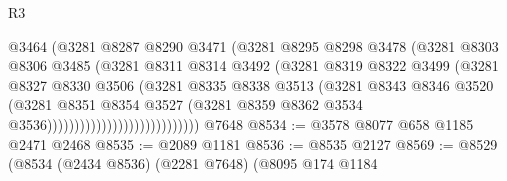 \begin{lexlean}{R3}
\begin{coremodule}
                                        @3464
                                        (@3281
                                          @8287
                                          @8290
                                          @3471
                                          (@3281
                                            @8295
                                            @8298
                                            @3478
                                            (@3281
                                              @8303
                                              @8306
                                              @3485
                                              (@3281
                                                @8311
                                                @8314
                                                @3492
                                                (@3281
                                                  @8319
                                                  @8322
                                                  @3499
                                                  (@3281
                                                    @8327
                                                    @8330
                                                    @3506
                                                    (@3281
                                                      @8335
                                                      @8338
                                                      @3513
                                                      (@3281
                                                        @8343
                                                        @8346
                                                        @3520
                                                        (@3281
                                                          @8351
                                                          @8354
                                                          @3527
                                                          (@3281
                                                            @8359
                                                            @8362
                                                            @3534
                                                            @3536))))))))))))))))))))))))))))
    @7648
@8534 := @3578 @8077 @658 @1185 @2471 @2468
@8535 := @2089 @1181
@8536 := @8535 @2127
@8569 := @8529
    (@8534
      (@2434 @8536)
      (@2281 @7648)
      (@8095
        @174
        @1184

\end{coremodule}
\end{lexlean}
